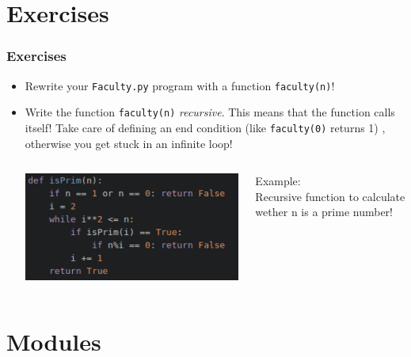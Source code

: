 \documentclass{beamer}
\begin{document}
\section{Exercises}

\begin{frame}
\frametitle{Exercises}
	\begin{itemize}
		\item Rewrite your \texttt{Faculty.py} program with a function \texttt{faculty(n)}!
		\item Write the function \texttt{faculty(n)} \textit{recursive}. This means that the function calls itself! Take care of defining an end condition (like \texttt{faculty(0)} returns 1) , otherwise you get stuck in an infinite loop! \\
		\begin{columns}[T]
		\begin{column}[T]{6cm}
			\includegraphics[width = 1\textwidth]{recursivePrim.pdf}
		\end{column}
		\begin{column}[T]{4cm}
			Example: \\
			Recursive function to calculate wether n is a prime number! 
		\end{column}
		\end{columns}
	\end{itemize}
\end{frame}

\section{Modules}
\end{document}
